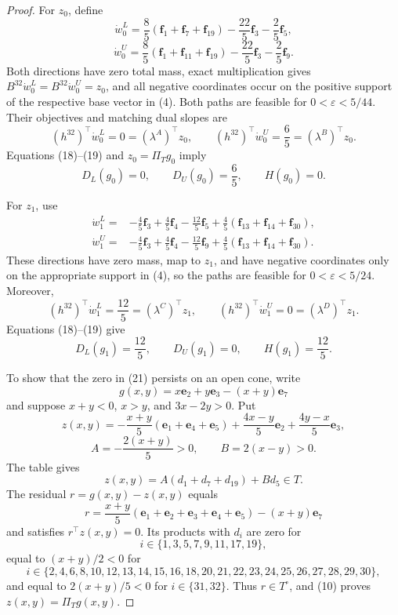 \documentclass{article}
\begin{document}
\begin{proof}
For \(z_0\), define
\[
\dot w^L_0=\frac85(\mathbf f_1+\mathbf f_7+\mathbf f_{19})
-\frac{22}{5}\mathbf f_3-\frac25\mathbf f_5,
\]
\[
\dot w^U_0=\frac85(\mathbf f_1+\mathbf f_{11}+\mathbf f_{19})
-\frac{22}{5}\mathbf f_3-\frac25\mathbf f_9.
\tag{20}
\]
Both directions have zero total mass, exact multiplication gives \(B^{32}\dot w^L_0=B^{32}\dot w^U_0=z_0\), and all negative coordinates occur on the positive support of the respective base vector in (4).  Both paths are feasible for \(0<\varepsilon<5/44\).  Their objectives and matching dual slopes are
\[
(h^{32})^{\top}\dot w^L_0=0=(\lambda^A)^{\top}z_0,
\qquad
(h^{32})^{\top}\dot w^U_0=\frac65=(\lambda^B)^{\top}z_0.
\]
Equations (18)--(19) and \(z_0=\Pi_Tg_0\) imply
\[
D_L(g_0)=0,
\qquad
D_U(g_0)=\frac65,
\qquad
H(g_0)=0.
\tag{21}
\]

For \(z_1\), use
\[
\begin{aligned}
\dot w^L_1={}&-\frac45\mathbf f_3+\frac45\mathbf f_4-\frac{12}{5}\mathbf f_5
+\frac45(\mathbf f_{13}+\mathbf f_{14}+\mathbf f_{30}),\\
\dot w^U_1={}&-\frac45\mathbf f_3+\frac45\mathbf f_4-\frac{12}{5}\mathbf f_9
+\frac45(\mathbf f_{13}+\mathbf f_{14}+\mathbf f_{30}).
\end{aligned}
\tag{22}
\]
These directions have zero mass, map to \(z_1\), and have negative coordinates only on the appropriate support in (4), so the paths are feasible for \(0<\varepsilon<5/24\).  Moreover,
\[
(h^{32})^{\top}\dot w^L_1=\frac{12}{5}=(\lambda^C)^{\top}z_1,
\qquad
(h^{32})^{\top}\dot w^U_1=0=(\lambda^D)^{\top}z_1.
\]
Equations (18)--(19) give
\[
D_L(g_1)=\frac{12}{5},
\qquad
D_U(g_1)=0,
\qquad
H(g_1)=\frac{12}{5}.
\tag{23}
\]

To show that the zero in (21) persists on an open cone, write
\[
g(x,y)=x\mathbf e_2+y\mathbf e_3-(x+y)\mathbf e_7
\]
and suppose \(x+y<0\), \(x>y\), and \(3x-2y>0\).  Put
\[
z(x,y)=-\frac{x+y}{5}(\mathbf e_1+\mathbf e_4+\mathbf e_5)
+\frac{4x-y}{5}\mathbf e_2+\frac{4y-x}{5}\mathbf e_3,
\tag{24}
\]
\[
A=-\frac{2(x+y)}5>0,
\qquad
B=2(x-y)>0.
\]
The table gives
\[
z(x,y)=A(d_1+d_7+d_{19})+Bd_5\in T.
\tag{25}
\]
The residual \(r=g(x,y)-z(x,y)\) equals
\[
r=\frac{x+y}{5}(\mathbf e_1+\mathbf e_2+\mathbf e_3+\mathbf e_4+\mathbf e_5)
-(x+y)\mathbf e_7
\tag{26}
\]
and satisfies \(r^{\top}z(x,y)=0\).  Its products with \(d_i\) are zero for
\[
i\in\{1,3,5,7,9,11,17,19\},
\]
equal to \((x+y)/2<0\) for
\[
i\in\{2,4,6,8,10,12,13,14,15,16,18,20,21,22,23,24,25,26,27,28,29,30\},
\]
and equal to \(2(x+y)/5<0\) for \(i\in\{31,32\}\).  Thus \(r\in T^\circ\), and (10) proves \(z(x,y)=\Pi_Tg(x,y)\).


\end{proof}
\end{document}
